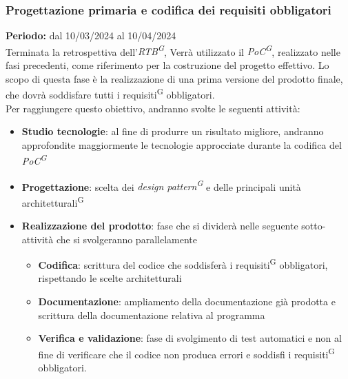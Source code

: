 \documentclass[5pt]{article}
\begin{document}
\subsubsection{Progettazione primaria e codifica dei requisiti obbligatori}
\textbf{Periodo:} dal 10/03/2024 al 10/04/2024 
\vspace{0.3cm} \\
Terminata la retrospettiva dell'\textit{RTB\textsuperscript{G}}, Verrà utilizzato il \textit{PoC\textsuperscript{G}}, realizzato nelle fasi precedenti, 
come riferimento per la costruzione del progetto effettivo.
Lo scopo di questa fase è la realizzazione di una prima versione del prodotto finale, che dovrà soddisfare tutti i requisiti\textsuperscript{G} obbligatori. \\
Per raggiungere questo obiettivo, andranno svolte le seguenti attività:
\begin{itemize}
  \item \textbf{Studio tecnologie}: al fine di produrre un risultato migliore, andranno approfondite maggiormente le tecnologie approcciate 
  durante la codifica del \textit{PoC\textsuperscript{G}}
  \item \textbf{Progettazione}: scelta dei \textit{design pattern\textsuperscript{G}} e delle principali unità architetturali\textsuperscript{G}
  \item \textbf{Realizzazione del prodotto}: fase che si dividerà nelle seguente sotto-attività che si svolgeranno parallelamente
  \begin{itemize}
    \item \textbf{Codifica}: scrittura del codice che soddisferà i requisiti\textsuperscript{G} obbligatori, rispettando le scelte architetturali
    \item \textbf{Documentazione}: ampliamento della documentazione già prodotta e scrittura della documentazione relativa al programma
    \item \textbf{Verifica e validazione}: fase di svolgimento di test automatici e non al fine di verificare che il codice non produca errori e soddisfi i requisiti\textsuperscript{G} obbligatori.
  \end{itemize}  
\end{itemize}
\end{document}

